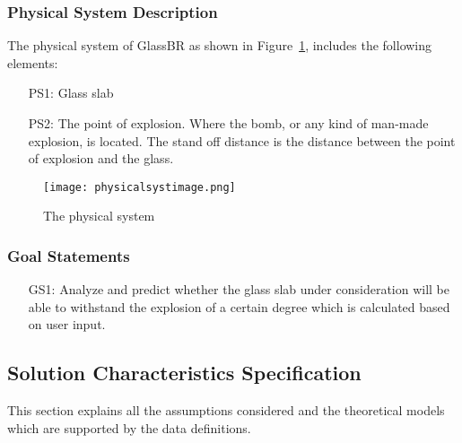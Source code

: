 \documentclass[12pt]{article}
\begin{document}
\subsubsection{Physical System Description}
\label{Sec:PSD}
The physical system of GlassBR as shown in Figure~\ref{Figure:Tps}, includes the following elements:
\begin{itemize}
\item[PS1:]Glass slab
\item[PS2:]The point of explosion. Where the bomb, or any kind of man-made explosion, is located. The stand off distance is the distance between the point of explosion and the glass.
\end{itemize}
\begin{figure}
\begin{center}
\texttt{[image: physicalsystimage.png]}
\caption{The physical system}
\label{Figure:Tps}
\end{center}
\end{figure}
\subsubsection{Goal Statements}
\label{Sec:GS}
\begin{itemize}
\item[GS1:]Analyze and predict whether the glass slab under consideration will be able to withstand the explosion of a certain degree which is calculated based on user input.
\end{itemize}
\subsection{Solution Characteristics Specification}
\label{Sec:SCS}
This section explains all the assumptions considered and the theoretical models which are supported by the data definitions.
\end{document}
